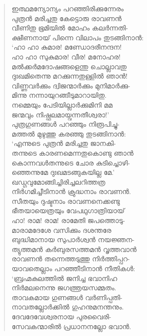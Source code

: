 \begin{verse}
ഇത്ഥമന്യോന്യം പറഞ്ഞിരിക്കുന്നേരം\\
പുത്രന്‍ മരിച്ചതു കേട്ടൊരു രാവണന്‍\\
വീണിതു ഭൂമിയില്‍ മോഹം കലര്‍ന്നതി-\\
ക്ഷീണനായ് പിന്നെ വിലാപം തുടങ്ങിനാന്‍:\\
‘ഹാ ഹാ കുമാര! മണ്ഡോദരീനന്ദന!\\
ഹാ ഹാ സുകുമാര! വീര! മനോഹര!\\
മല്‍ക്കര്‍മദോഷങ്ങളെന്തു ചൊല്ലാവതു\\
ദുഃഖമിതെന്നു മറക്കുന്നതുള്ളില്‍ ഞാന്‍!\\
വിണ്ണവര്‍ക്കും ദ്വിജന്മാര്‍ക്കും മുനിമാര്‍ക്കു-\\
മിന്നു നന്നായുറങ്ങീടുമാറായിതു.\\
നമ്മെയും പേടിയില്ലാര്‍ക്കുമിനി മമ\\
ജന്മവും നിഷ്ഫലമായ്വന്നതീശ്വരാ!’\\
പുത്രഗുണങ്ങള്‍ പറഞ്ഞും നിരൂപിച്ചു-\\
മത്തല്‍ മുഴുത്തു കരഞ്ഞു തുടങ്ങിനാന്‍:\\
‘എന്നുടെ പുത്രന്‍ മരിച്ചതു ജാനകി-\\
തന്നുടെ കാരണമെന്നതുകൊണ്ടു ഞാന്‍\\
കൊന്നവള്‍തന്നുടെ ചോര കുടിച്ചൊഴി-\\
ഞ്ഞെന്നുമേ ദുഃഖമടങ്ങുകയില്ല മേ.’\\
ഖഡ്ഗവുമോങ്ങിച്ചിരിച്ചലറിത്തത്ര\\
നിര്‍ഗമിച്ചീടിനാന്‍ ക്രുദ്ധനാം രാവണന്‍.\\
സീതയും ദുഷ്ടനാം രാവണനെക്കണ്ടു\\
ഭീതയായെത്രയും വേപഥുഗാത്രിയായ്\\
ഹാ! രാമ! രാമ! രാമേതി ജപത്തൊടു-\\
മാരാമദേശേ വസിക്കും ദശന്തരേ\\
ബുദ്ധിമാനായ സുപാര്‍ശ്വന്‍ നയജ്ഞന-\\
ത്യുത്തമന്‍ കര്‍ബുരസത്തമന്‍ വൃത്തവാന്‍\\
രാവണന്‍ തന്നെത്തടുത്തു നിര്‍ത്തിപ്പറ-\\
യാവതെല്ലാം പറഞ്ഞീടിനാന്‍ നീതികള്‍:\\
‘ബ്രഹ്മകുലത്തില്‍ ജനിച്ച ഭവാനിഹ\\
നിര്‍മലനെന്നു ജഗത്ത്രയസമ്മതം.\\
താവകമായ ഗുണങ്ങള്‍ വര്‍ണിപ്പതി-\\
നാവതല്ലോര്‍ക്കില്‍ ഗുഹനുമനന്തനും.\\
ദേവദേവേശ്വരനായ പുരവൈരി-\\
സേവകന്മാരില്‍ പ്രധാനനല്ലോ ഭവാന്‍.\\

\end{verse}

